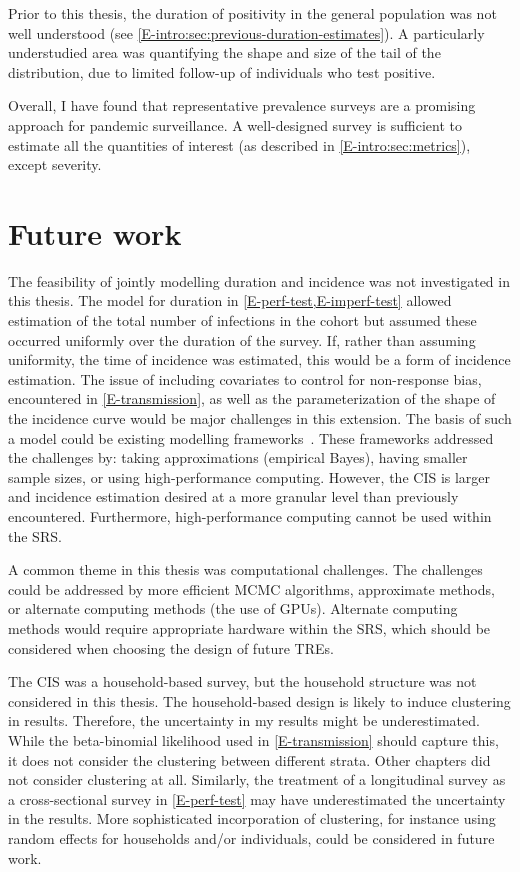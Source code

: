 \documentclass[thesis.tex]{subfiles}
\begin{document}
Prior to this thesis, the duration of positivity in the general population was not well understood (see \cref{E-intro:sec:previous-duration-estimates}).
A particularly understudied area was quantifying the shape and size of the tail of the distribution, due to limited follow-up of individuals who test positive.

Overall, I have found that representative prevalence surveys are a promising approach for pandemic surveillance.
A well-designed survey is sufficient to estimate all the quantities of interest (as described in \cref{E-intro:sec:metrics}), except severity.


\section{Future work} \label{conclusion:sec:future-work}

The feasibility of jointly modelling duration and incidence was not investigated in this thesis.
The model for duration in \cref{E-perf-test,E-imperf-test} allowed estimation of the total number of infections in the cohort but assumed these occurred uniformly over the duration of the survey.
If, rather than assuming uniformity, the time of incidence was estimated, this would be a form of incidence estimation.
The issue of including covariates to control for non-response bias, encountered in \cref{E-transmission}, as well as the parameterization of the shape of the incidence curve would be major challenges in this extension.
The basis of such a model could be existing modelling frameworks~\autocite[e.g.][]{taffeJoint,haySerosolver}.
These frameworks addressed the challenges by: taking approximations (\eg empirical Bayes), having smaller sample sizes, or using high-performance computing.
However, the CIS is larger and incidence estimation desired at a more granular level than previously encountered.
Furthermore, high-performance computing cannot be used within the SRS.

A common theme in this thesis was computational challenges.
The challenges could be addressed by more efficient MCMC algorithms, approximate methods, or alternate computing methods (\eg the use of GPUs).
Alternate computing methods would require appropriate hardware within the SRS, which should be considered when choosing the design of future TREs.

The CIS was a household-based survey, but the household structure was not considered in this thesis.
The household-based design is likely to induce clustering in results.
Therefore, the uncertainty in my results might be underestimated.
While the beta-binomial likelihood used in \cref{E-transmission} should capture this, it does not consider the clustering between different strata.
Other chapters did not consider clustering at all.
Similarly, the treatment of a longitudinal survey as a cross-sectional survey in \cref{E-perf-test} may have underestimated the uncertainty in the results.
More sophisticated incorporation of clustering, for instance using random effects for households and/or individuals, could be considered in future work.
\end{document}

